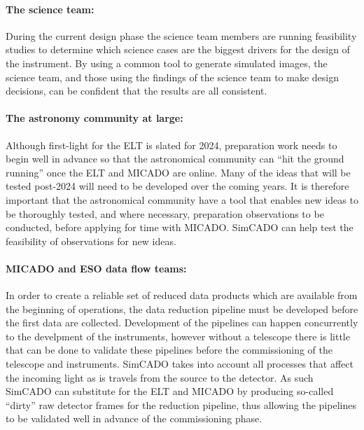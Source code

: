 \paragraph{The science team:} During the current design phase the science team members are running feasibility studies to determine which science cases are the biggest drivers for the design of the instrument. By using a common tool to generate simulated images, the science team, and those using the findings of the science team to make design decisions, can be confident that the results are all consistent. 

\paragraph{The astronomy community at large:} Although first-light for the ELT is slated for 2024, preparation work needs to begin well in advance so that the astronomical community can ``hit the ground running'' once the ELT and MICADO are online. Many of the ideas that will be tested post-2024 will need to be developed over the coming years. It is therefore important that the astronomical community have a tool that enables new ideas to be thoroughly tested, and where necessary, preparation observations to be conducted, before applying for time with MICADO. SimCADO can help test the feasibility of observations for new ideas.

\paragraph{MICADO and ESO data flow teams:} In order to create a reliable set of reduced data products which are available from the beginning of operations, the data reduction pipeline must be developed before the first data are collected. Development of the pipelines can happen concurrently to the develpment of the instruments, however without a telescope there is little that can be done to validate these pipelines before the commissioning of the telescope and instruments. SimCADO takes into account all processes that affect the incoming light as is travels from the source to the detector. As such SimCADO can substitute for the ELT and MICADO by producing so-called ``dirty'' raw detector frames for the reduction pipeline, thus allowing the pipelines to be validated well in advance of the commissioning phase.

